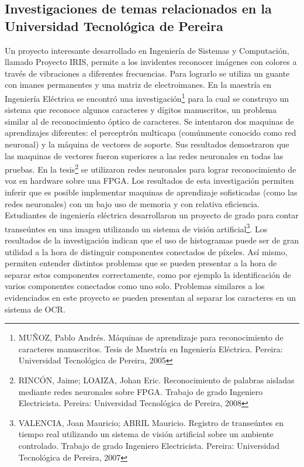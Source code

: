 \documentclass[a4paper, 11pt, oneside]{report}
\begin{document}
\subsection{Investigaciones de temas relacionados en la Universidad Tecnológica de Pereira}
Un proyecto interesante desarrollado en Ingeniería de Sistemas y Computación, llamado Proyecto IRIS, permite a los invidentes reconocer imágenes con colores a través de vibraciones a diferentes frecuencias. Para lograrlo se utiliza un guante con imanes permanentes y una matriz de electroimanes.
En la maestría en Ingeniería Eléctrica se encontró una investigación\footnote{MUÑOZ, Pablo Andrés. Máquinas de aprendizaje para reconocimiento de caracteres manuscritos. Tesis de Maestría en Ingeniería Eléctrica. Pereira: Universidad Tecnológica de Pereira, 2005} para la cual se construyo un sistema que reconoce algunos caracteres y dígitos manuscritos, un problema similar al de reconocimiento óptico de caracteres. Se intentaron dos maquinas de aprendizajes diferentes: el perceptrón multicapa (comúnmente conocido como red neuronal) y la máquina de vectores de soporte. Sus resultados demostraron que las maquinas de vectores fueron superiores a las redes neuronales en todas las pruebas.
En la tesis\footnote{RINCÓN, Jaime; LOAIZA, Johan Eric. Reconocimiento de palabras aisladas mediante redes neuronales sobre FPGA. Trabajo de grado Ingeniero Electricista. Pereira: Universidad Tecnológica de Pereira, 2008} se utilizaron redes neuronales para lograr reconocimiento de voz en hardware sobre una FPGA. Los resultados de esta investigación permiten inferir que es posible implementar maquinas de aprendizaje sofisticadas (como las redes neuronales) con un bajo uso de memoria y con relativa eficiencia.
Estudiantes de ingeniería eléctrica desarrollaron un proyecto de grado para contar transeúntes en una imagen utilizando un sistema de visión artificial\footnote{VALENCIA, Joan Mauricio; ABRIL Mauricio. Registro de transeúntes en tiempo real utilizando un sistema de visión artificial sobre un ambiente controlado. Trabajo de grado Ingeniero Electricista. Pereira: Universidad Tecnológica de Pereira, 2007}. Los resultados de la investigación indican que el uso de histogramas puede ser de gran utilidad a la hora de distinguir componentes conectados de píxeles. Así mismo, permiten entender distintos problemas que se pueden presentar a la hora de separar estos componentes correctamente, como por ejemplo la identificación de varios componentes conectados como uno solo. Problemas similares a los evidenciados en este proyecto se pueden presentan al separar los caracteres en un sistema de OCR.
\end{document}

